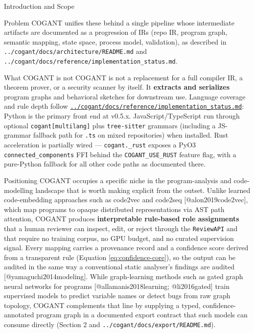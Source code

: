\documentclass[
  ignorenonframetext,
]{beamer}
\begin{document}
\begin{frame}[fragile]{Introduction and Scope}
\begin{block}{Problem}
COGANT unifies these behind a single pipeline whose intermediate
artifacts are documented as a progression of IRs (repo IR, program
graph, semantic mapping, state space, process model, validation), as
described in \texttt{../cogant/docs/architecture/README.md} and
\texttt{../cogant/docs/reference/implementation\_status.md}.
\end{block}

\begin{block}{What COGANT is not}
\protect{}\label{what-cogant-is-not}
COGANT is not a replacement for a full compiler IR, a theorem prover, or
a security scanner by itself. It \textbf{extracts and serializes}
program graphs and behavioral sketches for downstream use. Language
coverage and rule depth follow
\href{../cogant/docs/reference/implementation_status.md}{\texttt{../cogant/docs/reference/implementation\_status.md}}:
Python is the primary front end at v0.5.x. JavaScript/TypeScript run
through optional \texttt{cogant{[}multilang{]}} plus
\texttt{tree-sitter} grammars (including a JS-grammar fallback path for
\texttt{.ts} on mixed repositories) when installed. Rust acceleration is
partially wired --- \texttt{cogant.\_rust} exposes a PyO3
\texttt{connected\_components} FFI behind the \texttt{COGANT\_USE\_RUST}
feature flag, with a pure-Python fallback for all other code paths as
documented there.
\end{block}

\begin{block}{Positioning}
\protect{}\label{positioning}
COGANT occupies a specific niche in the program-analysis and
code-modelling landscape that is worth making explicit from the outset.
Unlike learned code-embedding approaches such as code2vec and code2seq
{[}@alon2019code2vec{]}, which map programs to opaque distributed
representations via AST path attention, COGANT produces
\textbf{interpretable rule-based role assignments} that a human reviewer
can inspect, edit, or reject through the \texttt{ReviewAPI} and that
require no training corpus, no GPU budget, and no curated supervision
signal. Every mapping carries a provenance record and a confidence score
derived from a transparent rule (Equation \ref{eq:confidence-core}), so
the output can be audited in the same way a conventional static
analyser's findings are audited {[}@yamaguchi2014modeling{]}. While
graph-learning methods such as gated graph neural networks for programs
{[}@allamanis2018learning; @li2016gated{]} train supervised models to
predict variable names or detect bugs from raw graph topology, COGANT
complements that line by supplying a typed, confidence-annotated program
graph in a documented export contract that such models can consume
directly (Section 2 and \texttt{../cogant/docs/export/README.md}).


\end{block}
\end{frame}
\end{document}
